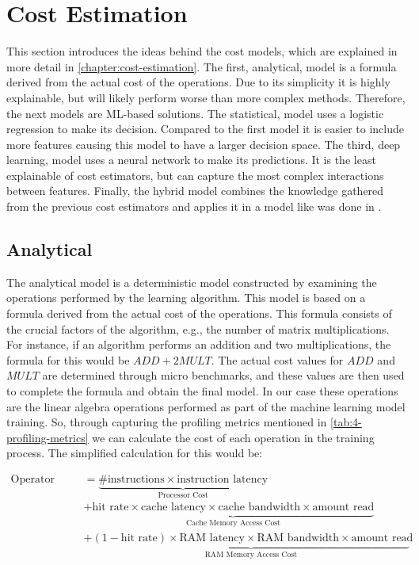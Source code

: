 \section{Cost Estimation}
\label{sec:4-cost-estimation}

This section introduces the ideas behind the cost models, which are explained in more detail in \autoref{chapter:cost-estimation}. The first, analytical, model is a formula derived from the actual cost of the operations. Due to its simplicity it is highly explainable, but will likely perform worse than more complex methods. Therefore, the next models are ML-based solutions. The statistical, model uses a logistic regression to make its decision. Compared to the first model it is easier to include more features causing this model to have a larger decision space. The third, deep learning, model uses a neural network to make its predictions. It is the least explainable of cost estimators, but can capture the most complex interactions between features. Finally, the hybrid model combines the knowledge gathered from the previous cost estimators and applies it in a model like was done in \cite{halide_cost_model}.

\subsection{Analytical}
The analytical model is a deterministic model constructed by examining the operations performed by the learning algorithm. This model is based on a formula derived from the actual cost of the operations. This formula consists of the crucial factors of the algorithm, e.g., the number of matrix multiplications. For instance, if an algorithm performs an addition and two multiplications, the formula for this would be $ADD + 2MULT$. The actual cost values for $ADD$ and $MULT$ are determined through micro benchmarks, and these values are then used to complete the formula and obtain the final model. In our case these operations are the linear algebra operations performed as part of the machine learning model training. So, through capturing the profiling metrics mentioned in \autoref{tab:4-profiling-metrics} we can calculate the cost of each operation in the training process. The simplified calculation for this would be:

\vspace{-0.5cm}
\begin{align*}
  \text{{Operator cost}} & =  \underbrace{\# \text{{instructions}} \times \text{{instruction latency}}}_{\text{{Processor Cost}}}                                                         \\
                         & + \underbrace{\text{{hit rate}} \times \text{{cache latency}} \times \text{{cache bandwidth}} \times \text{{amount read}}}_{\text{{Cache Memory Access Cost}}} \\
                         & + \underbrace{(1 - \text{{hit rate}}) \times \text{{RAM latency}} \times \text{{RAM bandwidth}} \times \text{{amount read}}}_{\text{{RAM Memory Access Cost}}}
\end{align*}

